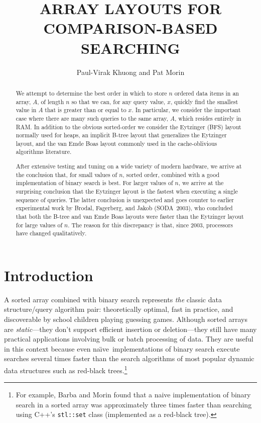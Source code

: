\documentclass{patmorin}
\title{\MakeUppercase{Array Layouts for Comparison-Based Searching}}
\author{Paul-Virak Khuong and Pat Morin}
\newcommand{\naive}{na\"{\i}ve}
\begin{document}
\begin{titlepage}
\maketitle


\begin{abstract}
  We attempt to determine the best order in which to store $n$ ordered
  data items in an array, $A$, of length $n$ so that we can, for any query
  value, $x$, quickly find the smallest value in $A$ that is greater
  than or equal to $x$. In particular, we consider the important case
  where there are many such queries to the same array, $A$, which resides
  entirely in RAM.  In addition to the obvious sorted-order we consider
  the Eytzinger (BFS) layout normally used for heaps, an implicit B-tree
  layout that generalizes the Eytzinger layout, and the van Emde Boas
  layout commonly used in the cache-oblivious algorithms literature.

  After extensive testing and tuning on a wide variety of modern hardware,
  we arrive at the conclusion that, for small values of $n$, sorted
  order, combined with a good implementation of binary search is best.
  For larger values of $n$, we arrive at the surprising conclusion that
  the Eytzinger layout is the fastest when executing a single sequence
  of queries.  The latter conclusion is unexpected and goes counter to
  earlier experimental work by Brodal, Fagerberg, and Jakob (SODA~2003),
  who concluded that both the B-tree and van Emde Boas layouts were faster
  than the Eytzinger layout for large values of $n$.  The reason for this
  discrepancy is that, since 2003, processors have changed qualitatively.
\end{abstract}

\end{titlepage}

\tableofcontents
\newpage

\section{Introduction}

A sorted array combined with binary search represents \emph{the} classic
data structure/query algorithm pair: theoretically optimal, fast in
practice, and discoverable by school children playing guessing games.
Although sorted arrays are \emph{static}---they don't support efficient
insertion or deletion---they still have many practical applications
involving bulk or batch processing of data.  They are useful in this
context because even \naive\ implementations of binary search execute
searches several times faster than the search algorithms of most
popular dynamic data structures such as red-black trees.\footnote{For
example, Barba and Morin \cite{bmXX} found that a naive implementation
of binary search in a sorted array was approximately three times faster
than searching using C++'s \texttt{stl::set} class (implemented as a
red-black tree).}
\end{document}
